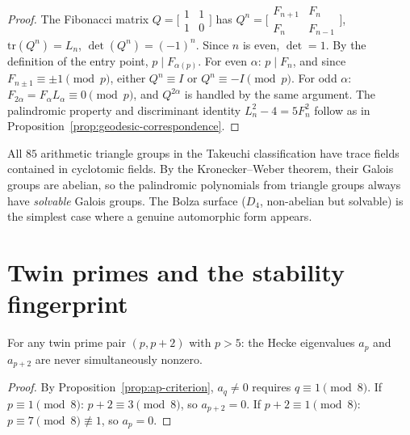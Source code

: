 \begin{proof}
The Fibonacci matrix $Q = \bigl[\begin{smallmatrix}1&1\\1&0
\end{smallmatrix}\bigr]$ has $Q^n =
\bigl[\begin{smallmatrix}F_{n+1}&F_n\\F_n&F_{n-1}
\end{smallmatrix}\bigr]$, $\mathrm{tr}(Q^n) = L_n$,
$\det(Q^n) = (-1)^n$.
Since $n$ is even, $\det = 1$.
By the definition of the entry point, $p \mid F_{\alpha(p)}$.
For even $\alpha$: $p \mid F_n$, and since
$F_{n \pm 1} \equiv \pm 1 \pmod{p}$,
either $Q^n \equiv I$ or $Q^n \equiv -I \pmod{p}$.
For odd $\alpha$: $F_{2\alpha} = F_\alpha L_\alpha \equiv 0 \pmod{p}$,
and $Q^{2\alpha}$ is handled by the same argument.
The palindromic property and discriminant identity
$L_n^2 - 4 = 5F_n^2$ follow as in
Proposition~\ref{prop:geodesic-correspondence}.
\end{proof}

\begin{remark}
\label{rmk:takeuchi}
All $85$ arithmetic triangle groups in the Takeuchi
classification have trace fields contained in cyclotomic fields.
By the Kronecker--Weber theorem, their Galois groups are
abelian, so the palindromic polynomials from triangle groups
always have \emph{solvable} Galois groups.
The Bolza surface ($D_4$, non-abelian but solvable) is the
simplest case where a genuine automorphic form appears.
\end{remark}

\section{Twin primes and the stability fingerprint}

\begin{proposition}
\label{prop:twin-anti}
For any twin prime pair $(p, p{+}2)$ with $p > 5$:
the Hecke eigenvalues $a_p$ and $a_{p+2}$ are never
simultaneously nonzero.
\end{proposition}

\begin{proof}
By Proposition~\ref{prop:ap-criterion},
$a_q \ne 0$ requires $q \equiv 1 \pmod{8}$.
If $p \equiv 1 \pmod{8}$: $p + 2 \equiv 3 \pmod{8}$,
so $a_{p+2} = 0$.
If $p + 2 \equiv 1 \pmod{8}$: $p \equiv 7 \pmod{8}
\not\equiv 1$, so $a_p = 0$.
\end{proof}

